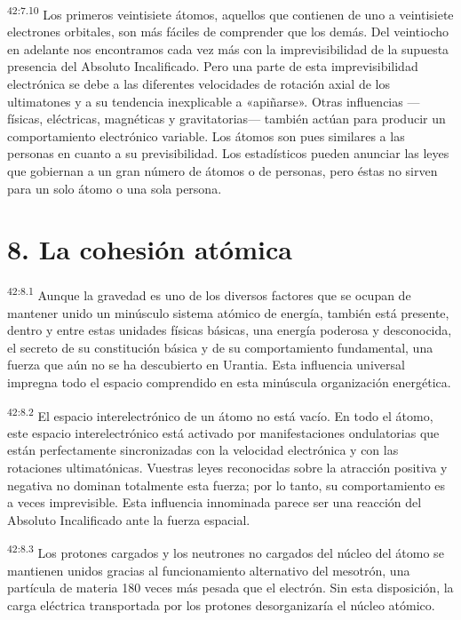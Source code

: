 \par
\textsuperscript{42:7.10} Los primeros veintisiete átomos, aquellos que contienen de uno a veintisiete electrones orbitales, son más fáciles de comprender que los demás. Del veintiocho en adelante nos encontramos cada vez más con la imprevisibilidad de la supuesta presencia del Absoluto Incalificado. Pero una parte de esta imprevisibilidad electrónica se debe a las diferentes velocidades de rotación axial de los ultimatones y a su tendencia inexplicable a «apiñarse». Otras influencias ---físicas, eléctricas, magnéticas y gravitatorias--- también actúan para producir un comportamiento electrónico variable. Los átomos son pues similares a las personas en cuanto a su previsibilidad. Los estadísticos pueden anunciar las leyes que gobiernan a un gran número de átomos o de personas, pero éstas no sirven para un solo átomo o una sola persona.

\section*{8. La cohesión atómica}
\par
\textsuperscript{42:8.1} Aunque la gravedad es uno de los diversos factores que se ocupan de mantener unido un minúsculo sistema atómico de energía, también está presente, dentro y entre estas unidades físicas básicas, una energía poderosa y desconocida, el secreto de su constitución básica y de su comportamiento fundamental, una fuerza que aún no se ha descubierto en Urantia. Esta influencia universal impregna todo el espacio comprendido en esta minúscula organización energética.

\par
\textsuperscript{42:8.2} El espacio interelectrónico de un átomo no está vacío. En todo el átomo, este espacio interelectrónico está activado por manifestaciones ondulatorias que están perfectamente sincronizadas con la velocidad electrónica y con las rotaciones ultimatónicas. Vuestras leyes reconocidas sobre la atracción positiva y negativa no dominan totalmente esta fuerza; por lo tanto, su comportamiento es a veces imprevisible. Esta influencia innominada parece ser una reacción del Absoluto Incalificado ante la fuerza espacial.

\par
\textsuperscript{42:8.3} Los protones cargados y los neutrones no cargados del núcleo del átomo se mantienen unidos gracias al funcionamiento alternativo del mesotrón, una partícula de materia 180 veces más pesada que el electrón. Sin esta disposición, la carga eléctrica transportada por los protones desorganizaría el núcleo atómico.

